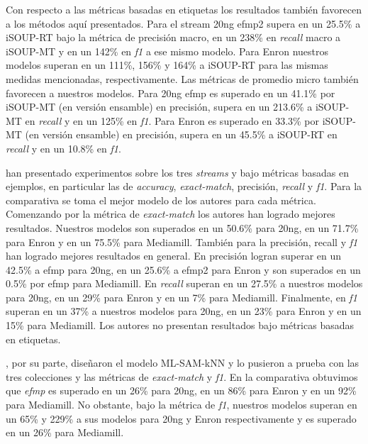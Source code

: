 Con respecto a las métricas basadas en etiquetas los resultados también
favorecen a los métodos aquí presentados. Para el stream 20ng \acrshort{efmp2}
supera en un 25.5\% a iSOUP-RT bajo la métrica de precisión macro, en un 238\%
en \textit{recall} macro a iSOUP-MT y en un 142\% en \textit{f1} a ese mismo
modelo. Para Enron nuestros modelos superan en un 111\%, 156\% y 164\% a
iSOUP-RT para las mismas medidas mencionadas, respectivamente. Las métricas de
promedio micro también favorecen a nuestros modelos. Para 20ng \acrshort{efmp}
es superado en un 41.1\% por iSOUP-MT (en versión ensamble) en precisión, supera
en un 213.6\% a iSOUP-MT en \textit{recall} y en un 125\% en \textit{f1}. Para
Enron es superado en 33.3\% por iSOUP-MT (en versión ensamble) en precisión,
supera en un 45.5\% a iSOUP-RT en \textit{recall} y en un 10.8\% en \textit{f1}.

\citeauthor{sousa_multi-label_2018} han presentado experimentos sobre los tres
\textit{streams} y bajo métricas basadas en ejemplos, en particular las de
\textit{accuracy}, \textit{exact-match}, precisión, \textit{recall} y
\textit{f1}. Para la comparativa se toma el mejor modelo de los autores para
cada métrica. Comenzando por la métrica de \textit{exact-match} los autores han
logrado mejores resultados. Nuestros modelos son superados en un 50.6\% para
20ng, en un 71.7\% para Enron y en un 75.5\% para Mediamill. También para la
precisión, recall y \textit{f1} \citeauthor{sousa_multi-label_2018} han logrado
mejores resultados en general.  En precisión logran superar en un 42.5\% a
\acrshort{efmp} para 20ng, en un 25.6\% a \acrshort{efmp2} para Enron y son
superados en un 0.5\% por \acrshort{efmp} para Mediamill. En \textit{recall}
superan en un 27.5\% a nuestros modelos para 20ng, en un 29\% para Enron y en un
7\% para Mediamill.  Finalmente, en \textit{f1} superan en un 37\% a nuestros
modelos para 20ng, en un 23\% para Enron y en un 15\% para Mediamill. Los
autores no presentan resultados bajo métricas basadas en etiquetas.

\citeauthor{roseberry_multi-label_2018}, por su parte, diseñaron el modelo
ML-SAM-kNN y lo pusieron a prueba con las tres colecciones y las métricas de
\textit{exact-match} y \textit{f1}. En la comparativa obtuvimos que
\textit{efmp} es superado en un 26\% para 20ng, en un 86\% para Enron y en un
92\% para Mediamill. No obstante, bajo la métrica de \textit{f1}, nuestros
modelos superan en un 65\% y 229\% a sus modelos para 20ng y Enron
respectivamente y es superado en un 26\% para Mediamill.

